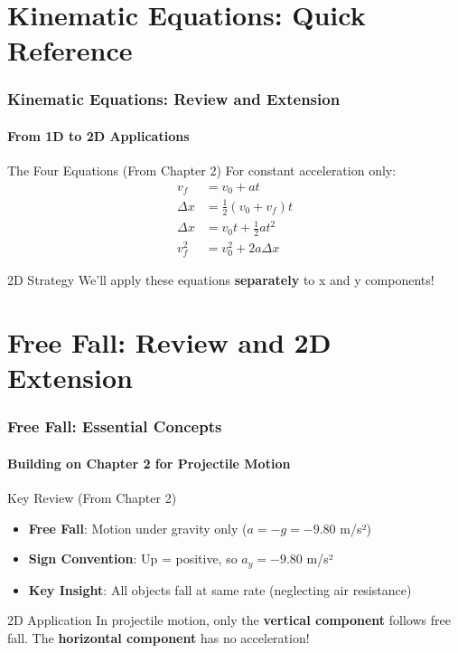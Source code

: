 \documentclass{beamer}
\begin{document}
\section{Kinematic Equations: Quick Reference}

\begin{frame}
\frametitle{Kinematic Equations: Review and Extension}
\framesubtitle{From 1D to 2D Applications}
\begin{block}{The Four Equations (From Chapter 2)}
For constant acceleration only:
\begin{align*}
    v_f &= v_0 + at \\
    \Delta x &= \frac{1}{2}(v_0 + v_f)t \\
    \Delta x &= v_0 t + \frac{1}{2}at^2 \\
    v_f^2 &= v_0^2 + 2a\Delta x
\end{align*}
\end{block}
\begin{alertblock}{2D Strategy}
We'll apply these equations \textbf{separately} to x and y components!
\end{alertblock}
\end{frame}

\section{Free Fall: Review and 2D Extension}

\begin{frame}
\frametitle{Free Fall: Essential Concepts}
\framesubtitle{Building on Chapter 2 for Projectile Motion}
\begin{block}{Key Review (From Chapter 2)}
\begin{itemize}
    \item \textbf{Free Fall}: Motion under gravity only ($a = -g = -9.80$ m/s²)
    \item \textbf{Sign Convention}: Up = positive, so $a_y = -9.80$ m/s²
    \item \textbf{Key Insight}: All objects fall at same rate (neglecting air resistance)
\end{itemize}
\end{block}
\begin{alertblock}{2D Application}
In projectile motion, only the \textbf{vertical component} follows free fall. The \textbf{horizontal component} has no acceleration!
\end{alertblock}
\end{frame}
\end{document}
